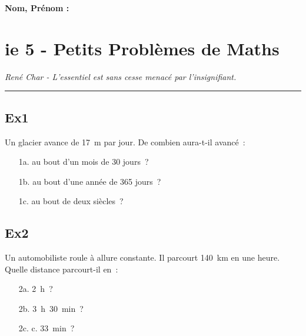 \documentclass[12pt]{article}
\newcommand{\horrule}[1]{\rule{\linewidth}{#1}} %
\begin{document}

\newtheorem{Definition}{Définition}
\newtheorem{Theorem}{Théorème}
\newtheorem{Proposition}{Propriété}

\renewcommand{\labelitemi}{$\bullet$}
\renewcommand{\labelitemii}{$\circ$}

\setlength{\columnseprule}{1pt}

\textbf{Nom, Prénom : }

\section*{ie 5 - Petits Problèmes de Maths}
\begin{center}
  \textit{René Char - L’essentiel est sans cesse menacé par l’insignifiant.}
\end{center}
\horrule{2px}


\begin{multicols}{2}
\subsection*{Ex1}
Un glacier avance de 17 m par jour. De combien aura-t-il avancé :
\begin{itemize}
\item[1a.] au bout d’un mois de 30 jours ?
\item[1b.] au bout d’une année de 365 jours ?
\item[1c.] au bout de deux siècles ?
\end{itemize}

\subsection*{Ex2}
Un automobiliste roule à allure constante. Il parcourt 140 km en une heure. Quelle distance parcourt-il en :
\begin{itemize}
\item[2a.] 2 h ? 	
\item[2b.] 3 h 30 min ? 	
\item[2c.] c. 33 min ? 
\end{itemize}
\end{multicols}
\end{document}
